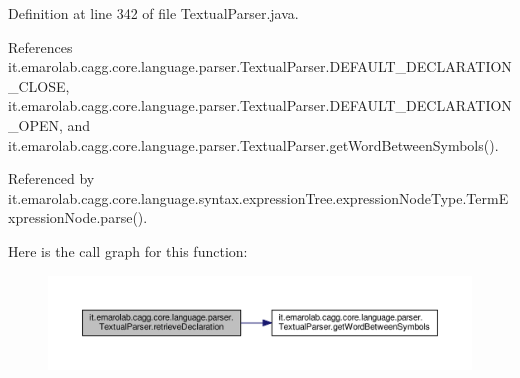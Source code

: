 Definition at line 342 of file Textual\-Parser.\-java.



References it.\-emarolab.\-cagg.\-core.\-language.\-parser.\-Textual\-Parser.\-D\-E\-F\-A\-U\-L\-T\-\_\-\-D\-E\-C\-L\-A\-R\-A\-T\-I\-O\-N\-\_\-\-C\-L\-O\-S\-E, it.\-emarolab.\-cagg.\-core.\-language.\-parser.\-Textual\-Parser.\-D\-E\-F\-A\-U\-L\-T\-\_\-\-D\-E\-C\-L\-A\-R\-A\-T\-I\-O\-N\-\_\-\-O\-P\-E\-N, and it.\-emarolab.\-cagg.\-core.\-language.\-parser.\-Textual\-Parser.\-get\-Word\-Between\-Symbols().



Referenced by it.\-emarolab.\-cagg.\-core.\-language.\-syntax.\-expression\-Tree.\-expression\-Node\-Type.\-Term\-Expression\-Node.\-parse().



Here is the call graph for this function\-:\nopagebreak
\begin{figure}[H]
\begin{center}
\leavevmode
\includegraphics[width=350pt]{classit_1_1emarolab_1_1cagg_1_1core_1_1language_1_1parser_1_1TextualParser_a7a131de61ed1326cfe72b187b917e3be_cgraph}
\end{center}
\end{figure}


